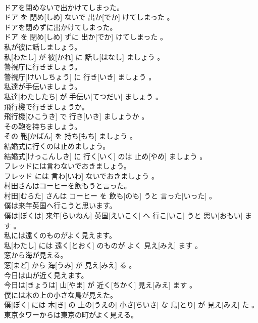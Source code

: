\documentclass[8pt]{extreport}
\begin{document}
\begin{CJK}{UTF8}{min}
\\	ドアを閉めないで出かけてしまった。	
\\	ドア を 閉め[しめ] ないで 出か[でか] けてしまった 。
\\	ドアを閉めずに出かけてしまった。	
\\	ドア を 閉め[しめ] ずに 出か[でか] けてしまった 。
\\	私が彼に話しましょう。	
\\	私[わたし] が 彼[かれ] に 話し[はなし] ましょう 。
\\	警視庁に行きましょう。	
\\	警視庁[けいしちょう] に 行き[いき] ましょう 。
\\	私達が手伝いましょう。	
\\	私達[わたしたち] が 手伝い[てつだい] ましょう 。
\\	飛行機で行きましょうか。	
\\	飛行機[ひこうき] で 行き[いき] ましょうか 。
\\	その鞄を持ちましょう。	
\\	その 鞄[かばん] を 持ち[もち] ましょう 。
\\	結婚式に行くのは止めましょう。	
\\	結婚式[けっこんしき] に 行く[いく] のは 止め[やめ] ましょう 。
\\	フレッドには言わないでおきましょう。	
\\	フレッド には 言わ[いわ] ないでおきましょう 。
\\	村田さんはコーヒーを飲もうと言った。	
\\	村田[むらた] さんは コーヒー を 飲も[のも] うと 言った[いった] 。
\\	僕は来年英国へ行こうと思います。	
\\	僕は[ぼくは] 来年[らいねん] 英国[えいこく] へ 行こ[いこ] うと 思い[おもい] ます 。
\\	私には遠くのものがよく見えます。	
\\	私[わたし] には 遠く[とおく] のものが よく 見え[みえ] ます 。
\\	窓から海が見える。	
\\	窓[まど] から 海[うみ] が 見え[みえ] る 。
\\	今日は山が近く見えます。	
\\	今日は[きょうは] 山[やま] が 近く[ちかく] 見え[みえ] ます 。
\\	僕には木の上の小さな鳥が見えた。	
\\	僕[ぼく] には 木[き] の 上の[うえの] 小さ[ちいさ] な 鳥[とり] が 見え[みえ] た 。
\\	東京タワーからは東京の町がよく見える。	

\end{CJK}
\end{document}
